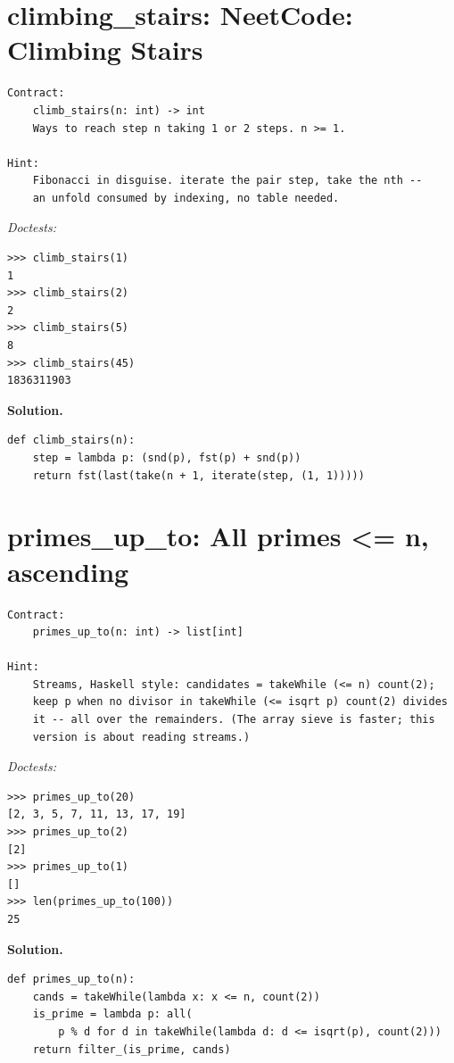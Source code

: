 \documentclass[11pt,letterpaper]{book}
\begin{document}
\section{climbing\_stairs: NeetCode: Climbing Stairs}
\begin{lstlisting}[style=spec]
Contract:
    climb_stairs(n: int) -> int
    Ways to reach step n taking 1 or 2 steps. n >= 1.

Hint:
    Fibonacci in disguise. iterate the pair step, take the nth --
    an unfold consumed by indexing, no table needed.
\end{lstlisting}
\noindent\textit{Doctests:}
\begin{lstlisting}[style=spec]
>>> climb_stairs(1)
1
>>> climb_stairs(2)
2
>>> climb_stairs(5)
8
>>> climb_stairs(45)
1836311903
\end{lstlisting}
\noindent\textbf{Solution.}
\begin{lstlisting}[style=code]
def climb_stairs(n):
    step = lambda p: (snd(p), fst(p) + snd(p))
    return fst(last(take(n + 1, iterate(step, (1, 1)))))
\end{lstlisting}

\section{primes\_up\_to: All primes <= n, ascending}
\begin{lstlisting}[style=spec]
Contract:
    primes_up_to(n: int) -> list[int]

Hint:
    Streams, Haskell style: candidates = takeWhile (<= n) count(2);
    keep p when no divisor in takeWhile (<= isqrt p) count(2) divides
    it -- all over the remainders. (The array sieve is faster; this
    version is about reading streams.)
\end{lstlisting}
\noindent\textit{Doctests:}
\begin{lstlisting}[style=spec]
>>> primes_up_to(20)
[2, 3, 5, 7, 11, 13, 17, 19]
>>> primes_up_to(2)
[2]
>>> primes_up_to(1)
[]
>>> len(primes_up_to(100))
25
\end{lstlisting}
\noindent\textbf{Solution.}
\begin{lstlisting}[style=code]
def primes_up_to(n):
    cands = takeWhile(lambda x: x <= n, count(2))
    is_prime = lambda p: all(
        p % d for d in takeWhile(lambda d: d <= isqrt(p), count(2)))
    return filter_(is_prime, cands)
\end{lstlisting}
\end{document}
